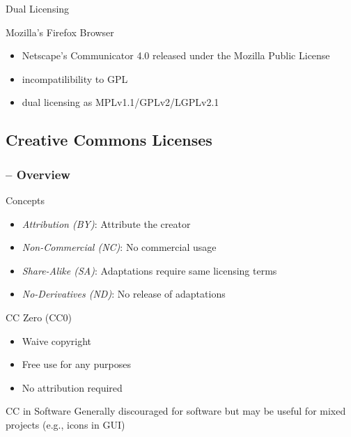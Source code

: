 \begin{frame}{\insertsubsection}
\begin{fancycolumns}
\begin{definition}{Dual Licensing}
\begin{itemize}
			\end{itemize}
		\end{definition}
		\hfill{}
		\begin{example}{Mozilla's Firefox Browser} %
			\begin{itemize}
				\item Netscape's Communicator 4.0 released under the Mozilla Public License
				\item incompatilibility to GPL
				\item dual licensing as MPLv1.1/GPLv2/LGPLv2.1
			\end{itemize}
		\end{example}
	\end{fancycolumns}
\end{frame}

\subsection{Creative Commons Licenses}

\begin{frame}
	\frametitle{\insertsubsection{} -- Overview}

	\begin{fancycolumns}[widths={50,50}, animation=none]
		\begin{definition}{Concepts}
			\begin{itemize}
				\item \emph{Attribution (BY)}: Attribute the creator
				\item \emph{Non-Commercial (NC)}: No commercial usage
				\item \emph{Share-Alike (SA)}: Adaptations require same licensing terms 
				\item \emph{No-Derivatives (ND)}: No release of adaptations
			\end{itemize}
		\end{definition}
		\begin{definition}{CC Zero (CC0)}
			\begin{itemize}
				\item Waive copyright
				\item Free use for any purposes
				\item No attribution required
			\end{itemize}
		\end{definition}
		\begin{note}{CC in Software}
			Generally discouraged for software but may be useful for mixed projects (e.g., icons in GUI)
		\end{note}
		\nextcolumn
			\centering{}
	\end{fancycolumns}
\end{frame}

